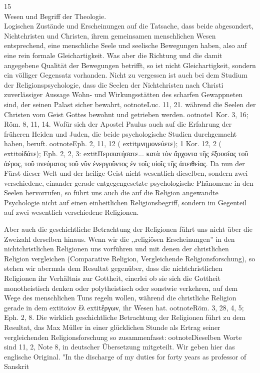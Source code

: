 15\\Wesen und Begriff der Theologie.\\Logischen Zustände und Erscheinungen auf die Tatsache, dass beide abgesondert, Nichtchristen und Christen, ihrem gemeinsamen menschlichen Wesen entsprechend, eine menschliche Seele und seelische Bewegungen haben, also auf eine rein formale Gleichartigkeit. Was aber die Richtung und die damit angegebene Qualität der Bewegungen betrifft, so ist nicht Gleichartigkeit, sondern ein völliger Gegensatz vorhanden. Nicht zu vergessen ist auch bei dem Studium der Religionspsychologie, dass die Seelen der Nichtchristen nach Christi zuverlässiger Aussage Wohn- und Wirkungsstätten des scharfen Gewappneten sind, der seinen Palast sicher bewahrt,ootnote{Luc. 11, 21.} während die Seelen der Christen vom Geist Gottes bewohnt und getrieben werden.ootnote{1 Kor. 3, 16; Röm. 8, 11, 14.} Wofür sich der Apostel Paulus auch auf die Erfahrung der früheren Heiden und Juden, die beide psychologische Studien durchgemacht haben, beruft.ootnote{Eph. 2, 11, 12 (	extit{μνημονεύετε}); 1 Kor. 12, 2 (	extit{οἰδάτε}); Eph. 2, 2, 3: 	extit{Περιπατήσατε... κατὰ τὸν ἄρχοντα τῆς ἐξουσίας τοῦ ἀέρος, τοῦ πνεύματος τοῦ νῦν ἐνεργοῦντος ἐν τοῖς υἱοῖς τῆς ἀπειθείας}.} Da nun der Fürst dieser Welt und der heilige Geist nicht wesentlich dieselben, sondern zwei verschiedene, einander gerade entgegengesetzte psychologische Phänomene in den Seelen hervorrufen, so führt uns auch die auf die Religion angewandte Psychologie nicht auf einen einheitlichen Religionsbegriff, sondern im Gegenteil auf zwei wesentlich verschiedene Religionen.\par Aber auch die geschichtliche Betrachtung der Religionen führt uns nicht über die Zweizahl derselben hinaus. Wenn wir die ,,religiösen Erscheinungen'' in den nichtchristlichen Religionen uns vorführen und mit denen der christlichen Religion vergleichen (Comparative Religion, Vergleichende Religionsforschung), so stehen wir abermals dem Resultat gegenüber, dass die nichtchristlichen Religionen ihr Verhältnis zur Gottheit, einerlei ob sie sich die Gottheit monotheistisch denken oder polytheistisch oder sonstwie verkehren, auf dem Wege des menschlichen Tuns regeln wollen, während die christliche Religion gerade in dem 	extit{oiov} ἔλ 	extit{ἔργων}, ihr Wesen hat.ootnote{Röm. 3, 28, 4, 5; Eph. 2, 8.} Die wirklich geschichtliche Betrachtung der Religionen führt zu dem Resultat, das Max Müller in einer glücklichen Stunde als Ertrag seiner vergleichenden Religionsforschung so zusammenfasst:ootnote{Dieselben Worte sind 11, 2, Note 8, in deutscher Übersetzung mitgeteilt. Wir geben hier das englische Original.} "In the discharge of my duties for forty years as professor of Sanskrit